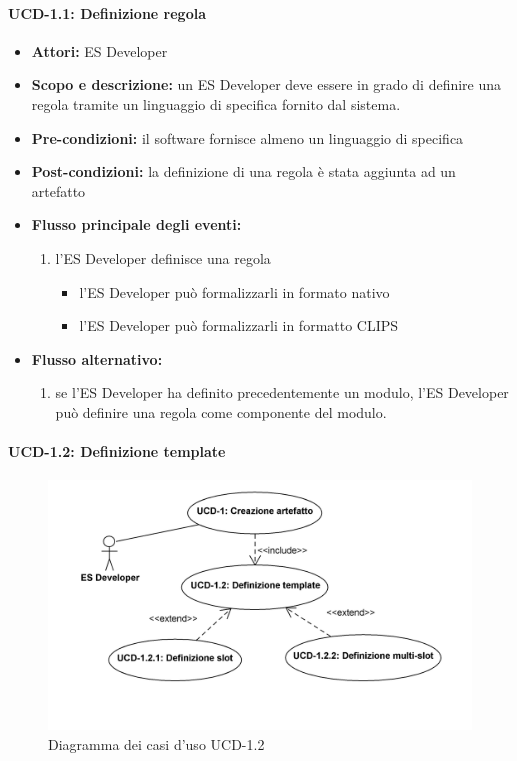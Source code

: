 \paragraph{UCD-1.1: Definizione regola}

\begin{itemize}
	\item \textbf{Attori:} ES Developer
	\item \textbf{Scopo e descrizione:} un ES Developer deve essere in grado di definire una regola tramite un linguaggio di specifica fornito dal sistema.
	\item \textbf{Pre-condizioni:} il software fornisce almeno un linguaggio di specifica
	\item \textbf{Post-condizioni:} la definizione di una regola è stata aggiunta ad un artefatto
	\item \textbf{Flusso principale degli eventi:}
		\begin{enumerate}
			\item l'ES Developer definisce una regola
			\begin{itemize}
				\item l'ES Developer può formalizzarli in formato nativo
				\item l'ES Developer può formalizzarli in formatto CLIPS
			\end{itemize}
		\end{enumerate}
	\item \textbf{Flusso alternativo:}
		\begin{enumerate}
			\item se l'ES Developer ha definito precedentemente un modulo, l'ES Developer può definire una regola come componente del modulo.
		\end{enumerate}
\end{itemize}


\paragraph{UCD-1.2: Definizione template}

\begin{figure}[h]
\centering
\includegraphics[width=1\textwidth]{Immagini/Capitolo2/UseCases/UCD-1_2.png}
\caption{Diagramma dei casi d'uso UCD-1.2}\label{fig:uc-ucd-1.2}
\end{figure}


